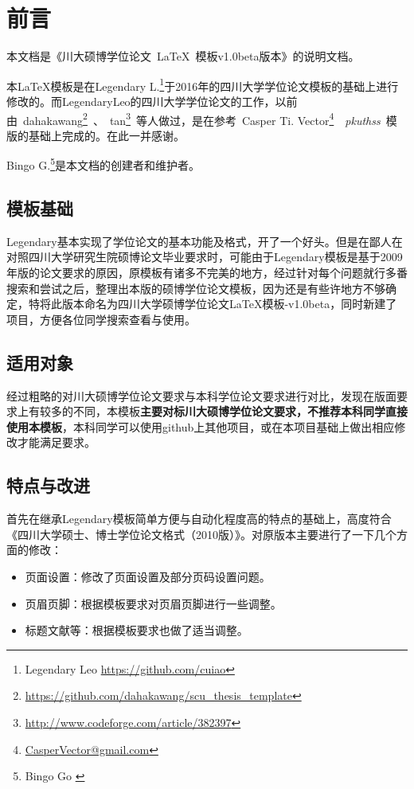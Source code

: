 
\chapter{前言}%
本文档是《川大硕博学位论文~\LaTeX~模板v1.0beta版本》的说明文档。

本LaTeX模板是在Legendary L.\footnote{Legendary Leo \url{https://github.com/cuiao}}于2016年的四川大学学位论文模板\cite{Legendarygit2016}的基础上进行修改的。而LegendaryLeo的四川大学学位论文的工作，以前由~dahakawang\footnote{\url{https://github.com/dahakawang/scu_thesis_template}}~、~tan\footnote{\url{http://www.codeforge.com/article/382397}}~等人做过，是在参考~Casper Ti. Vector\footnote{\url{CasperVector@gmail.com}}~~\emph{pkuthss}~模版\cite{pkuthss}的基础上完成的。在此一并感谢。


Bingo G.\footnote{Bingo Go \url{}}是本文档的创建者和维护者。
\section{模板基础}

\par Legendary基本实现了学位论文的基本功能及格式，开了一个好头。但是在鄙人在对照四川大学研究生院硕博论文毕业要求\cite{si2010si}时，可能由于Legendary模板是基于2009年版的论文要求的原因\cite{SCUDissertationFormat}，原模板有诸多不完美的地方，经过针对每个问题就行多番搜索和尝试之后，整理出本版的硕博学位论文模板，因为还是有些许地方不够确定，特将此版本命名为四川大学硕博学位论文LaTeX模板-v1.0beta，同时新建了项目，方便各位同学搜索查看与使用。

\section{适用对象}
经过粗略的对川大硕博学位论文要求与本科学位论文要求进行对比，发现在版面要求上有较多的不同，本模板\textbf{主要对标川大硕博学位论文要求，不推荐本科同学直接使用本模板}，本科同学可以使用github上其他项目，或在本项目基础上做出相应修改才能满足要求。

\section{特点与改进}
首先在继承Legendary模板简单方便与自动化程度高的特点的基础上，高度符合《四川大学硕士、博士学位论文格式（2010版）》\cite{si2010si}。对原版本主要进行了一下几个方面的修改：
\begin{itemize}
	\item 页面设置：修改了页面设置及部分页码设置问题。
	\item 页眉页脚：根据模板要求对页眉页脚进行一些调整。
	\item 标题文献等：根据模板要求也做了适当调整。
\end{itemize}

